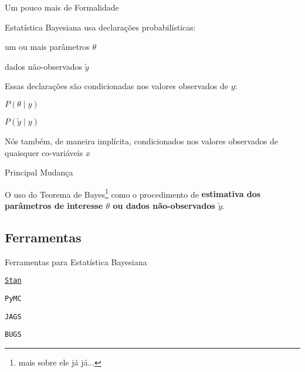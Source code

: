 \begin{frame}{Um pouco mais de Formalidade}
    \begin{vfilleditems}
        \item Estatística Bayesiana usa declarações probabilísticas:
        \begin{vfilleditems}
            \item um ou mais parâmetros $\theta$
            \item dados não-observados $\tilde{y}$
        \end{vfilleditems}
        \item Essas declarações são condicionadas nos valores observados de $y$:
        \begin{vfilleditems}
            \item $P(\theta \mid y)$
            \item $P(\tilde{y} \mid y)$
        \end{vfilleditems}
        \item Nós também, de maneira implícita, condicionados nos valores observados de quaisquer co-variáveis $x$
    \end{vfilleditems}
\end{frame}

\begin{frame}{Principal Mudança}
    \begin{defn}
        O uso do Teorema de Bayes\footnote{mais sobre ele já já...} como o procedimento de \textbf{estimativa dos parâmetros de interesse $\theta$ ou dados não-observados $\tilde{y}$}. \parencite{gelman2013bayesian}
    \end{defn}
\end{frame}

\subsection{Ferramentas}

\begin{frame}{Ferramentas para Estatística Bayesiana}
    \begin{vfilleditems}
        \item \LARGE  \href{https://mc-stan.org}{\texttt{Stan}}
        \item \texttt{PyMC}
        \item \small \texttt{JAGS}
        \item \footnotesize \texttt{BUGS}
    \end{vfilleditems}
\end{frame}

